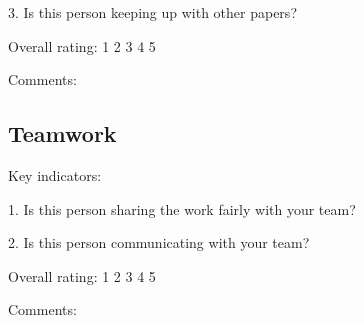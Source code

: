 \documentclass{article}   	%
\begin{document}
3.  Is this person keeping up with other papers?

Overall rating: \hskip 1cm 1 \hskip 1cm 2 \hskip 1cm 3 \hskip 1cm 4 \hskip 1cm 5 

Comments:

\vskip 5cm

\subsection*{Teamwork}

Key indicators: 

1.  Is this person sharing the work fairly with your team?

2.  Is this person communicating with your team?


Overall rating: \hskip 1cm 1 \hskip 1cm 2 \hskip 1cm 3 \hskip 1cm 4 \hskip 1cm 5 

Comments:

\vskip 4cm
\end{document}
